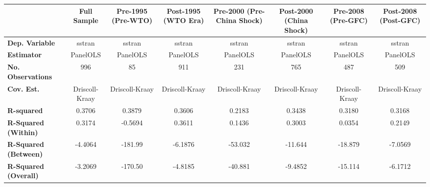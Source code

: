 \begin{center}
\begin{tabular}{lccccccc}
\toprule
                                   & \textbf{Full Sample} & \textbf{Pre-1995 (Pre-WTO)} & \textbf{Post-1995 (WTO Era)} & \textbf{Pre-2000 (Pre-China Shock)} & \textbf{Post-2000 (China Shock)} & \textbf{Pre-2008 (Pre-GFC)} & \textbf{Post-2008 (Post-GFC)}  \\
\midrule
\textbf{Dep. Variable}             &        sstran        &            sstran           &            sstran            &                sstran               &              sstran              &            sstran           &             sstran             \\
\textbf{Estimator}                 &       PanelOLS       &           PanelOLS          &           PanelOLS           &               PanelOLS              &             PanelOLS             &           PanelOLS          &            PanelOLS            \\
\textbf{No. Observations}          &         996          &              85             &             911              &                 231                 &               765                &             487             &              509               \\
\textbf{Cov. Est.}                 &    Driscoll-Kraay    &        Driscoll-Kraay       &        Driscoll-Kraay        &            Driscoll-Kraay           &          Driscoll-Kraay          &        Driscoll-Kraay       &         Driscoll-Kraay         \\
\textbf{R-squared}                 &        0.3706        &            0.3879           &            0.3606            &                0.2183               &              0.3438              &            0.3180           &             0.3168             \\
\textbf{R-Squared (Within)}        &        0.3174        &           -0.5694           &            0.3611            &                0.1436               &              0.3003              &            0.0354           &             0.2149             \\
\textbf{R-Squared (Between)}       &       -4.4064        &           -181.99           &           -6.1876            &               -53.032               &             -11.644              &           -18.879           &            -7.0569             \\
\textbf{R-Squared (Overall)}       &       -3.2069        &           -170.50           &           -4.8185            &               -40.881               &             -9.4852              &           -15.114           &            -6.1712             \\

\end{tabular}
\end{center}
